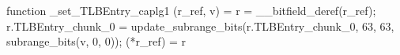 function _set_TLBEntry_caplg1 (r_ref, v) = {
    r = __bitfield_deref(r_ref);
    r.TLBEntry_chunk_0 = update_subrange_bits(r.TLBEntry_chunk_0, 63, 63, subrange_bits(v, 0, 0));
    (*r_ref) = r
}
